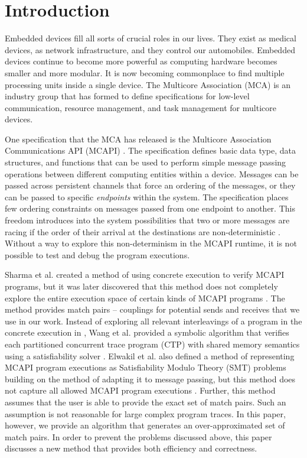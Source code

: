 \section{Introduction}
Embedded devices fill all sorts of crucial roles in our lives. They exist as
medical devices, as network infrastructure, and they control our automobiles.
Embedded devices continue to become more powerful as computing hardware becomes
smaller and more modular. It is now becoming commonplace to find multiple
processing units inside a single device. The Multicore Association (MCA) \cite{mca} is an
industry group that has formed to define specifications for low-level
communication, resource management, and task management for
multicore devices.

One specification that the MCA has released is the Multicore Association
Communications API (MCAPI) \cite{mcapi}. The specification defines basic data type, data
structures, and functions that can be used to perform simple message passing
operations between different computing entities within a device. Messages can be
passed across persistent channels that force an ordering of the messages, or
they can be passed to specific \emph{endpoints} within the system. The specification places few ordering constraints on messages passed from one
endpoint to another. This freedom introduces into the system possibilities that two or more messages are racing if the order of their arrival at the destinations are non-deterministic \cite{netzer:spdt96}. Without a way to explore this non-determinism in the MCAPI runtime, it is not possible to test and debug the program executions.

Sharma et al. created a method of using concrete execution to verify MCAPI
programs, but it was later discovered that this method does not completely
explore the entire execution space of certain kinds of MCAPI programs \cite{sharma:fmcad09}. The method provides match pairs -- couplings for potential sends and receives that we use in our work. Instead of exploring all relevant interleavings of a program in the concrete execution in \cite{sharma:fmcad09}, Wang et al. provided a symbolic algorithm that verifies each partitioned concurrent trace program (CTP) with shared memory semantics using a satisfiability solver \cite{wang:fse09}. Elwakil et al. also defined a method of representing MCAPI program executions as Satisfiability Modulo Theory (SMT) problems building on the method of \cite{wang:fse09} adapting it to message passing, but this method does not capture all allowed MCAPI program executions \cite{elwakil:padtad10}. Further, this method assumes that the user is able to provide the exact set of match pairs. Such an assumption is not reasonable for large complex program traces. In this paper, however, we provide an algorithm that generates an over-approximated set of match pairs. In order to prevent the problems discussed above, this paper discusses a new method that provides both efficiency and correctness.

